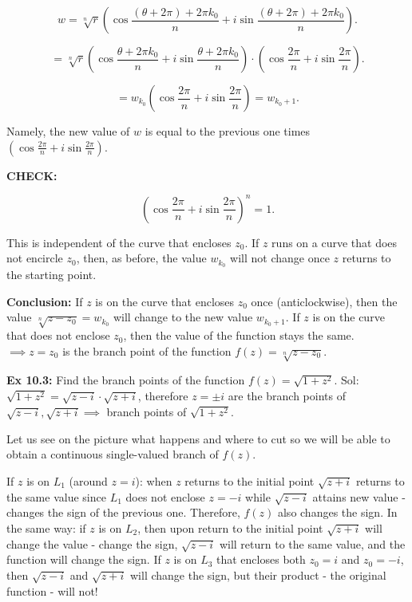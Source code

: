 \documentclass{article}
\begin{document}
\[
w = \sqrt[n]{r} \left( \cos \frac{(\theta + 2\pi) + 2\pi k_0}{n} + i \sin \frac{(\theta + 2\pi) + 2\pi k_0}{n} \right).
\]

\[
= \sqrt[n]{r} \left( \cos \frac{\theta + 2\pi k_0}{n} + i \sin \frac{\theta + 2\pi k_0}{n} \right) 
\cdot \left( \cos \frac{2\pi}{n} + i \sin \frac{2\pi}{n} \right).
\]

\[
= w_{k_0} \left( \cos \frac{2\pi}{n} + i \sin \frac{2\pi}{n} \right) = w_{k_0 + 1}.
\]

Namely, the new value of \( w \) is equal to the previous one times \( \left( \cos \frac{2\pi}{n} + i \sin \frac{2\pi}{n} \right) \).

\textbf{CHECK:} 

\[
\left( \cos \frac{2\pi}{n} + i \sin \frac{2\pi}{n} \right)^n = 1.
\]

This is independent of the curve that encloses \( z_0 \). If \( z \) runs on a curve that does not encircle \( z_0 \), then, as before, the value \( w_{k_0} \) will not change once \( z \) returns to the starting point.

\textbf{Conclusion:} If \( z \) is on the curve that encloses \( z_0 \) once (anticlockwise), then the value \( \sqrt[n]{z - z_0} = w_{k_0} \) will change to the new value \( w_{k_0 + 1} \). If \( z \) is on the curve that does not enclose \( z_0 \), 
then the value of the function stays the same.
$\implies z = z_0$ is the branch point of the function $f(z) = \sqrt[n]{z - z_0}$.

\textbf{Ex 10.3:} Find the branch points of the function $f(z) = \sqrt{1 + z^2}$.
Sol: $\sqrt{1 + z^2} = \sqrt{z - i} \cdot \sqrt{z + i}$, therefore $z = \pm i$ are the branch points of $\sqrt{z - i}, \sqrt{z + i} \implies$ branch points of $\sqrt{1 + z^2}$.

Let us see on the picture what happens and where to cut so we will be able to obtain a continuous single-valued branch of $f(z)$.

If $z$ is on $L_1$ (around $z = i$): when $z$ returns to the initial point $\sqrt{z + i}$ returns to the same value since $L_1$ does not enclose $z = -i$ while $\sqrt{z - i}$ attains new value - changes the sign of the previous one. Therefore, $f(z)$ also changes the sign. In the same way: if $z$ is on $L_2$, then upon return to the initial point $\sqrt{z + i}$ will change the value - change the sign, $\sqrt{z - i}$ will return to the same value, and the function will change the sign. If $z$ is on $L_3$ that encloses both $z_0 = i$ and $z_0 = -i$, then $\sqrt{z - i}$ and $\sqrt{z + i}$ will change the sign, but their product - the original function - will not!
\end{document}
